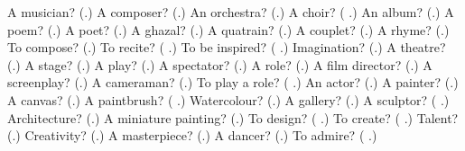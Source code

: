 \begin{tcolorbox}[breakable,colback=teal!4,colframe=teal!35!black,title={Before you move on}]
A musician? (\textbf{}.) A composer? (\textbf{}.) An orchestra? (\textbf{}.) A choir? (\textbf{ }.) An album? (\textbf{}.) A poem? (\textbf{}.) A poet? (\textbf{}.) A ghazal? (\textbf{}.) A quatrain? (\textbf{}.) A couplet? (\textbf{}.) A rhyme? (\textbf{}.) To compose? (\textbf{}.) To recite? (\textbf{ }.) To be inspired? (\textbf{ }.) Imagination? (\textbf{}.) A theatre? (\textbf{}.) A stage? (\textbf{}.) A play? (\textbf{}.) A spectator? (\textbf{}.) A role? (\textbf{}.) A film director? (\textbf{}.) A screenplay? (\textbf{}.) A cameraman? (\textbf{}.) To play a role? (\textbf{  }.) An actor? (\textbf{}.) A painter? (\textbf{}.) A canvas? (\textbf{}.) A paintbrush? (\textbf{ }.) Watercolour? (\textbf{}.) A gallery? (\textbf{}.) A sculptor? (\textbf{ }.) Architecture? (\textbf{}.) A miniature painting? (\textbf{}.) To design? (\textbf{ }.) To create? (\textbf{ }.) Talent? (\textbf{}.) Creativity? (\textbf{}.) A masterpiece? (\textbf{}.) A dancer? (\textbf{}.) To admire? (\textbf{ }.)
\end{tcolorbox}

